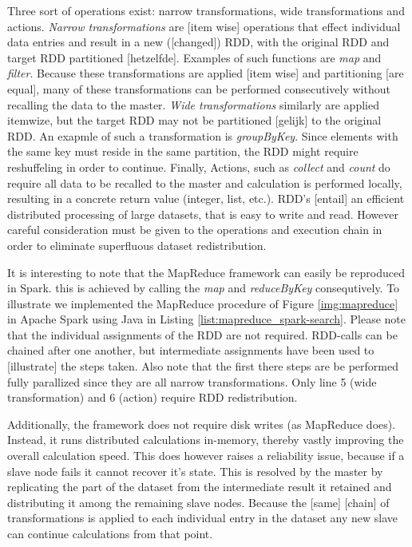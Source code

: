 Three sort of operations exist: narrow transformations, wide transformations and actions. \emph{Narrow transformations} are [item wise] operations that effect individual data entries and result in a new ([changed]) RDD, with the original RDD and target RDD partitioned [hetzelfde]. Examples of such functions are \emph{map} and \emph{filter}. Because these transformations are applied [item wise] and partitioning [are equal], many of these transformations can be performed consecutively without recalling the data to the master. \emph{Wide transformations} similarly are applied itemwize, but the target RDD may not be partitioned [gelijk] to the original RDD. An exapmle of such a transformation is \emph{groupByKey}. Since elements with  the same key must reside in the same partition, the RDD might require reshuffeling in order to continue. Finally,  Actions, such as \emph{collect} and \emph{count} do require all data to be recalled to the master and calculation is performed locally, resulting in a concrete return value (integer, list, etc.). RDD's [entail] an efficient distributed processing of large datasets, that is easy to write and read. However careful consideration must be given to the operations and execution chain in order to eliminate superfluous dataset redistribution.



It is interesting to note that the MapReduce framework can easily be reproduced in Spark. this is achieved by calling the \emph{map} and \emph{reduceByKey} consequtively. To illustrate we implemented the MapReduce procedure of Figure \ref{img:mapreduce} in Apache Spark using Java in Listing \ref{list:mapreduce_spark-search}. Please note that the individual assignments of the RDD are not required. RDD-calls can be chained after one another, but intermediate assignments have been used to [illustrate] the steps taken. Also note that the first there steps are be performed fully parallized since they are all narrow transformations. Only line 5 (wide transformation) and 6 (action) require RDD redistribution.\cite{web:user_manual}

Additionally, the framework does not require disk writes (as MapReduce does). Instead, it runs distributed calculations in-memory, thereby vastly improving the overall calculation speed. This does however raises a reliability issue, because if a slave node fails it cannot recover it's state. This is resolved by the master by replicating the part of the dataset from the intermediate result it retained and distributing it among the remaining slave nodes. Because the [same] [chain] of transformations is applied to each individual entry in the dataset any new slave can continue calculations from that point.\cite{web:fault_tolerance}

